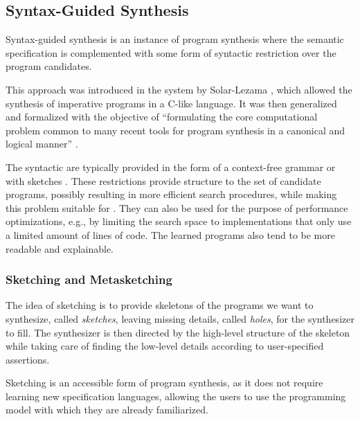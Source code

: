 \subsection{Syntax-Guided Synthesis}
\label{sec:syntax-guided}

Syntax-guided synthesis is an instance of program synthesis where the semantic
specification is complemented with some form of syntactic restriction over the
program candidates.

This approach was introduced in the  system by Solar-Lezama \cite{Solar-Lezama:2008}, which allowed the
synthesis of imperative programs in a C-like language.
It was then generalized and formalized with the objective of ``formulating the
core computational problem common to many recent tools for program synthesis in
a canonical and logical manner'' \cite{Alur:sygus:2013}.

The syntactic  are typically provided
in the form of a context-free grammar \cite{Alur:sygus:2013} or with sketches
\cite{Solar-Lezama:2008}. These restrictions provide structure to the set of
candidate programs, possibly resulting in more efficient search procedures,
while making this problem suitable for  \cite{Alur:sygus:2013}. They can also be used for
the purpose of performance optimizations, e.g., by limiting the search space to
implementations that only use a limited amount of lines of code. The learned
programs also tend to be more readable and explainable.

\subsubsection{Sketching and Metasketching}
\label{sec:sketching}

The idea of sketching is to provide skeletons of the programs we want to
synthesize, called \textit{sketches}, leaving missing details, called
\textit{holes}, for the synthesizer to fill.
The synthesizer is then directed by the high-level structure of the skeleton
while taking care of finding the low-level details according to user-specified
assertions.

Sketching is an accessible form of program synthesis, as it does not require
learning new specification languages, allowing the users to use the programming
model with which they are already familiarized.


